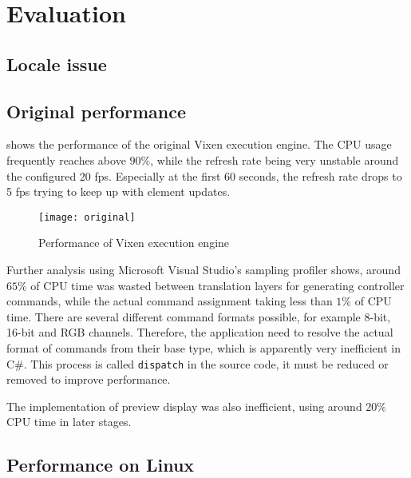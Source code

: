 \chapter{Evaluation}
\renewcommand{\baselinestretch}{\mystretch}
\label{chap:Eval}

\section{Locale issue}


\section{Original performance}

 shows the performance of the original Vixen execution engine. The CPU usage frequently reaches above $90 \%$, while the refresh rate being very unstable around the configured 20 fps. Especially at the first 60 seconds, the refresh rate drops to 5 fps trying to keep up with element updates. 

\begin{figure}[t]
    \centering
    \texttt{[image: original]}
    \caption{Performance of Vixen execution engine}
    \label{fig:original}
\end{figure}

Further analysis using Microsoft Visual Studio's sampling profiler shows, around $65 \%$ of CPU time was wasted between translation layers for generating controller commands, while the actual command assignment taking less than $1 \%$ of CPU time. There are several different command formats possible, for example 8-bit, 16-bit and RGB channels. Therefore, the application need to resolve the actual format of commands from their base type, which is apparently very inefficient in C\#. This process is called \texttt{dispatch} in the source code, it must be reduced or removed to improve performance. 

The implementation of preview display was also inefficient, using around $20 \%$ CPU time in later stages.


\section{Performance on Linux}

